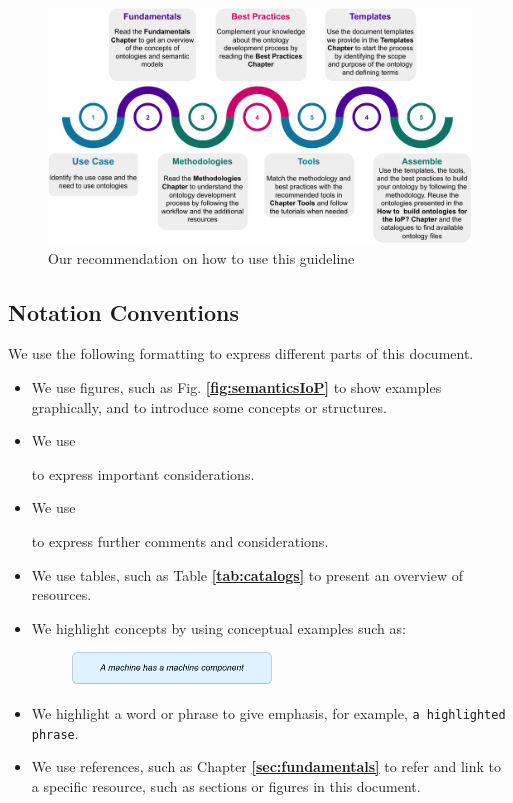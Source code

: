 \documentclass{guideline/sty/rapport}
\begin{document}
    \begin{figure}[H]
        \centering
          \includegraphics[width=\linewidth]{images/howtouseguideline.pdf}
          \caption{Our recommendation on how to use this guideline}
    \label{fig:howtousethisguideline}
    \end{figure}


\subsection{Notation Conventions}

We use the following formatting to express different parts of this document.

\begin{itemize}
    \item We use figures, such as Fig. \textbf{\ref{fig:semanticsIoP}} to show examples graphically, and to introduce some concepts or structures.
    \item We use \begin{beware}[Remark]
    to express important considerations.
    \end{beware}
    \item We use \begin{beware}[Note]
    to express further comments and considerations.
    \end{beware}
    \item We use tables, such as Table \textbf{\ref{tab:catalogs}} to present an overview of resources.
    \item We highlight concepts by using conceptual examples such as:
    \begin{figure}[H]
        \centering
          \includegraphics[width=0.5\textwidth]{images/implications0.pdf}
    \end{figure}
    \item We highlight a word or phrase to give emphasis, for example, \colorbox{bananamania}{\texttt{a highlighted phrase}}.
    \item We use references, such as Chapter \textbf{\ref{sec:fundamentals}} to refer and link to a specific resource, such as sections or figures in this document.
\end{itemize}
    
\end{document}
